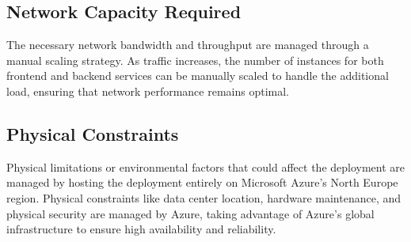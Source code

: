 \subsection{Network Capacity Required}
The necessary network bandwidth and throughput are managed through a manual scaling strategy. As traffic increases, the number of instances for both frontend and backend services can be manually scaled to handle the additional load, ensuring that network performance remains optimal.

\subsection{Physical Constraints}
Physical limitations or environmental factors that could affect the deployment are managed by hosting the deployment entirely on Microsoft Azure's North Europe region. Physical constraints like data center location, hardware maintenance, and physical security are managed by Azure, taking advantage of Azure's global infrastructure to ensure high availability and reliability.
